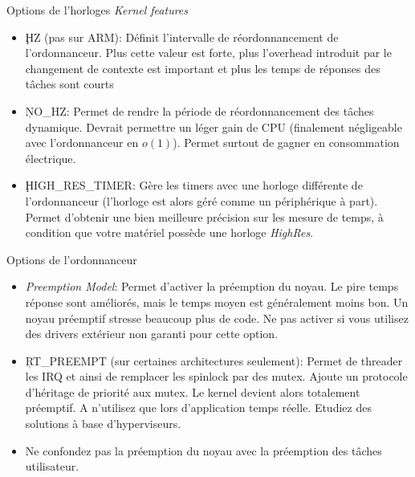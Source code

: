 \begin{frame}[fragile=singleslide]{Options de l'horloges}
  \emph{Kernel features}
  \begin{itemize} 
  \item \c{HZ} (pas sur ARM): Définit l'intervalle de réordonnancement
    de l'ordonnanceur.   Plus cette valeur est  forte, plus l'overhead
    introduit par le changement de  contexte est important et plus les
    temps de réponses des tâches sont courts
  \item \c{NO_HZ}: Permet de rendre la période de réordonnancement des
    tâches  dynamique.   Devrait  permettre  un  léger   gain  de  CPU
    (finalement  négligeable avec  l'ordonnanceur  en $o(1)$).  Permet
    surtout de gagner en consommation électrique.
  \item   \c{HIGH_RES_TIMER}:  Gère  les   timers  avec   une  horloge
    différente de  l'ordonnanceur (l'horloge  est alors géré  comme un
    périphérique  à  part).    Permet  d'obtenir  une  bien  meilleure
    précision sur les mesure de  temps, à condition que votre matériel
    possède une horloge \emph{HighRes}.
  \end{itemize}
\end{frame}  

\begin{frame}[fragile=singleslide]{Options de l'ordonnanceur}
  \begin{itemize} 
  \item  \emph{Preemption Model}:  Permet d'activer  la  préemption du
    noyau. Le pire  temps réponse sont améliorés, mais  le temps moyen
    est généralement  moins bon.  Un noyau  préemptif stresse beaucoup
    plus  de  code.  Ne  pas  activer  si  vous utilisez  des  drivers
    extérieur non garanti pour cette option.
  \item \c{RT_PREEMPT} (sur certaines architectures seulement): Permet
    de threader  les IRQ  et ainsi de  remplacer les spinlock  par des
    mutex.  Ajoute un protocole  d'héritage de priorité aux mutex.  Le
    kernel devient alors totalement  préemptif.  A n'utilisez que lors
    d'application  temps   réelle.   Etudiez  des   solutions  à  base
    d'hyperviseurs.
  \item Ne confondez pas la préemption du noyau avec la préemption des
    tâches utilisateur.
  \end{itemize}
\end{frame}  

